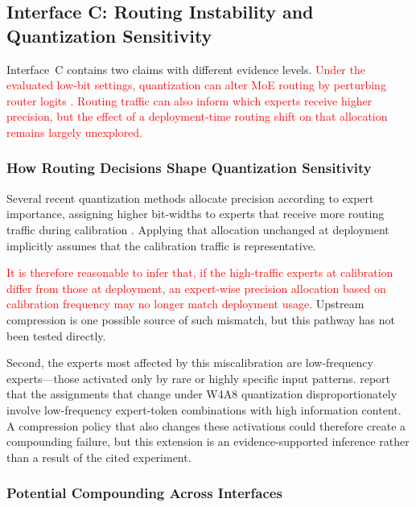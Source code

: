 \documentclass[10pt]{article}
\begin{document}
\subsection{Interface C: Routing Instability and Quantization
            Sensitivity}
\label{sec:interface_c}
Interface~C contains two claims with different evidence levels.
\textcolor{red}{Under the evaluated low-bit settings, quantization can alter MoE routing
by perturbing router logits
\citep{fu2026eaquantenhancingposttrainingquantization,park2026valueandstructurealignmentroutingconsistentquantization}.}
\textcolor{red}{Routing traffic can also inform which experts receive higher precision,
but the effect of a deployment-time routing shift on that allocation remains largely
unexplored.}

\subsubsection{How Routing Decisions Shape Quantization Sensitivity}

Several recent quantization methods allocate precision according to expert importance,
assigning higher bit-widths to experts that receive more routing traffic during
calibration \citep{deng2026gemqglobalexpertlevelmixedprecision}.  Applying that
allocation unchanged at deployment implicitly assumes that the calibration traffic is
representative.

\textcolor{red}{It is therefore reasonable to infer that, if the high-traffic experts
at calibration differ from those at deployment, an expert-wise precision allocation
based on calibration frequency may no longer match deployment usage.}  Upstream
compression is one possible source of such mismatch, but this pathway has not been
tested directly.

Second, the experts most affected by this miscalibration are
low-frequency experts---those activated only by rare or highly
specific input patterns.
\citet{fu2026eaquantenhancingposttrainingquantization} report that the assignments that change under W4A8 quantization
disproportionately involve low-frequency expert-token
combinations with high information content.
A compression policy that also changes these activations could therefore create a
compounding failure, but this extension is an evidence-supported inference rather than
a result of the cited experiment.

\subsubsection{Potential Compounding Across Interfaces}
\end{document}
